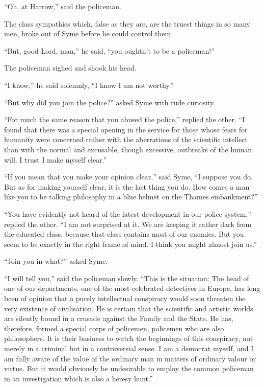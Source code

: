 \documentclass{book}
\begin{document}
“Oh, at Harrow,” said the policeman.

The class sympathies which, false as they are, are the truest things in so many men, broke out of Syme before he could control them.

“But, good Lord, man,” he said, “you oughtn’t to be a policeman!”

The policeman sighed and shook his head.

“I know,” he said solemnly, “I know I am not worthy.”

“But why did you join the police?” asked Syme with rude curiosity.

“For much the same reason that you abused the police,” replied the other. “I found that there was a special opening in the service for those whose fears for humanity were concerned rather with the aberrations of the scientific intellect than with the normal and excusable, though excessive, outbreaks of the human will. I trust I make myself clear.”

“If you mean that you make your opinion clear,” said Syme, “I suppose you do. But as for making yourself clear, it is the last thing you do. How comes a man like you to be talking philosophy in a blue helmet on the Thames embankment?”

“You have evidently not heard of the latest development in our police system,” replied the other. “I am not surprised at it. We are keeping it rather dark from the educated class, because that class contains most of our enemies. But you seem to be exactly in the right frame of mind. I think you might almost join us.”

“Join you in what?” asked Syme.

“I will tell you,” said the policeman slowly. “This is the situation: The head of one of our departments, one of the most celebrated detectives in Europe, has long been of opinion that a purely intellectual conspiracy would soon threaten the very existence of civilisation. He is certain that the scientific and artistic worlds are silently bound in a crusade against the Family and the State. He has, therefore, formed a special corps of policemen, policemen who are also philosophers. It is their business to watch the beginnings of this conspiracy, not merely in a criminal but in a controversial sense. I am a democrat myself, and I am fully aware of the value of the ordinary man in matters of ordinary valour or virtue. But it would obviously be undesirable to employ the common policeman in an investigation which is also a heresy hunt.”
\end{document}
